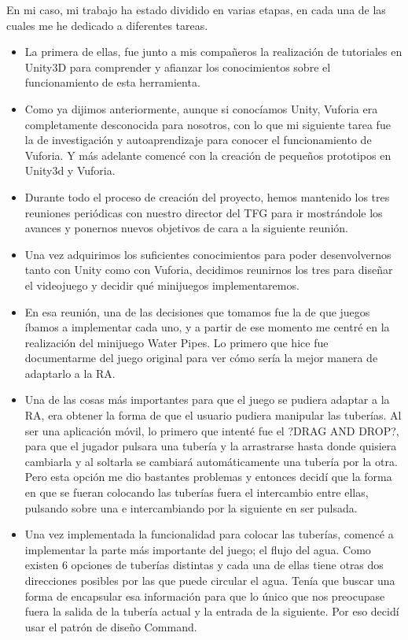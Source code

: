 En mi caso, mi trabajo ha estado dividido en varias etapas, en cada una de las cuales me he dedicado a diferentes tareas.

\begin{itemize}

\item{La primera de ellas, fue junto a mis compañeros la realización de tutoriales en Unity3D para comprender y afianzar los conocimientos sobre el funcionamiento de esta herramienta.}

\item{Como ya dijimos anteriormente, aunque si conocíamos Unity, Vuforia era completamente desconocida para nosotros, con lo que mi siguiente tarea fue la de investigación y autoaprendizaje para conocer el funcionamiento de Vuforia. Y más adelante comencé con la creación de pequeños prototipos en Unity3d y Vuforia.}

\item{Durante todo el proceso de creación del proyecto, hemos mantenido los tres reuniones periódicas con nuestro director del TFG para ir mostrándole los avances y ponernos nuevos objetivos de cara a la siguiente reunión.}

\item{Una vez adquirimos los suficientes conocimientos para poder desenvolvernos tanto con Unity como con Vuforia, decidimos reunirnos los tres para diseñar el videojuego y decidir qué minijuegos implementaremos.}

\item{En esa reunión, una de las decisiones que tomamos fue la de que juegos íbamos a implementar cada uno, y a partir de ese momento me centré en la realización del minijuego Water Pipes. 
Lo primero que hice fue documentarme del juego original para ver cómo sería la mejor manera de adaptarlo a la RA.}

\item{Una de las cosas más importantes para que el juego se pudiera adaptar a la RA, era obtener la forma de que el usuario pudiera manipular las tuberías. Al ser una aplicación móvil, lo primero que intenté fue el ?DRAG AND DROP?, para que el jugador pulsara una tubería y la arrastrarse hasta donde quisiera cambiarla y al soltarla se cambiará automáticamente una tubería por la otra. Pero esta opción me dio bastantes problemas y entonces decidí que la forma en que se fueran colocando las tuberías fuera el intercambio entre ellas, pulsando sobre una e intercambiando por la siguiente en ser pulsada.}

\item{Una vez implementada la funcionalidad para colocar las tuberías, comencé a implementar la parte más importante del juego; el flujo del agua. Como existen 6 opciones de tuberías distintas y cada una de ellas tiene otras dos direcciones posibles por las que puede circular el agua. Tenía que buscar una forma de encapsular esa información para que lo único que nos preocupase fuera la salida de la tubería actual y la entrada de la siguiente. Por eso decidí usar el patrón de diseño Command.}


\end{itemize}
